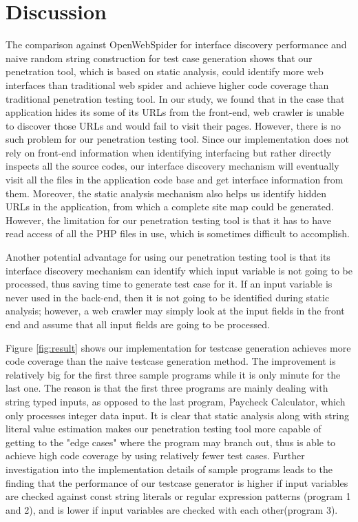 \chapter{Discussion}

The comparison against OpenWebSpider for interface discovery performance and naive random string construction for test case generation shows that our penetration tool, which is based on static analysis, could identify more web interfaces than traditional web spider and achieve higher code coverage than traditional penetration testing tool. In our study, we found that in the case that application hides its some of its URLs from the front-end, web crawler is unable to discover those URLs and would fail to visit their pages. However, there is no such problem for our penetration testing tool. Since our implementation does not rely on front-end information when identifying interfacing but rather directly inspects all the source codes, our interface discovery mechanism will eventually visit all the files in the application code base and get interface information from them. Moreover, the static analysis mechanism also helps us identify hidden URLs in the application, from which a complete site map could be generated. However, the limitation for our penetration testing tool is that it has to have read access of all the PHP files in use, which is sometimes difficult to accomplish.

Another potential advantage for using our penetration testing tool is that its interface discovery mechanism can identify which input variable is not going to be processed, thus saving time to generate test case for it. If an input variable is never used in the back-end, then it is not going to be identified during static analysis; however, a web crawler may simply look at the input fields in the front end and assume that all input fields are going to be processed.

Figure \ref{fig:result} shows our implementation for testcase generation achieves more code coverage than the naive testcase generation method. The improvement is relatively big for the first three sample programs while it is only minute for the last one. The reason is that the first three programs are mainly dealing with string typed inputs, as opposed to the last program, Paycheck Calculator, which only processes integer data input. It is clear that static analysis along with string literal value estimation makes our penetration testing tool more capable of getting to the "edge cases" where the program may branch out, thus is able to achieve high code coverage by using relatively fewer test cases. Further investigation into the implementation details of sample programs leads to the finding that the performance of our testcase generator is higher if input variables are checked against const  string literals or regular expression patterns (program 1 and 2), and is lower if input variables are checked with each other(program 3).